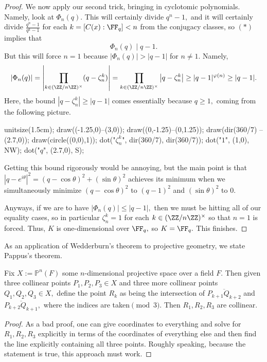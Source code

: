 \begin{proof}
	We now apply our second trick, bringing in cyclotomic polynomials. Namely, look at $\Phi_n(q).$ This will certainly divide $q^n-1,$ and it will certainly divide $\frac{q^n-1}{q^k-1}$ for each $k=[C(x):\FF_q]<n$ from the conjugacy classes, so $(*)$ implies that
	\[\Phi_n(q)\mid q-1.\]
	But this will force $n=1$ because $|\Phi_n(q)|>|q-1|$ for $n\ne1.$ Namely,
	\[\left|\Phi_n(q)\right|=\left|\prod_{k\in(\ZZ/n\ZZ)^\times}(q-\zeta_n^k)\right|=\prod_{k\in(\ZZ/n\ZZ)^\times}\left|q-\zeta_n^k\right|\ge|q-1|^{\varphi(n)}\ge|q-1|.\]
	Here, the bound $\left|q-\zeta_n^k\right|\ge|q-1|$ comes essentially because $q\ge1,$ coming from the following picture.
	\begin{center}
		\begin{asy}
			unitsize(1.5cm);
			draw((-1.25,0)--(3,0));
			draw((0,-1.25)--(0,1.25));
			draw(dir(360/7) -- (2.7,0));
			draw(circle((0,0),1));
			dot("$\zeta_n^k$", dir(360/7), dir(360/7));
			dot("$1$", (1,0), NW);
			dot("$q$", (2.7,0), S);
		\end{asy}
	\end{center}
	Getting this bound rigorously would be annoying, but the main point is that $\left|q-e^{i\theta}\right|^2=(q-\cos\theta)^2+(\sin\theta)^2$ achieves its minimum when we simultaneously minimize $(q-\cos\theta)^2$ to $(q-1)^2$ and $(\sin\theta)^2$ to $0.$

	Anyways, if we are to have $|\Phi_n(q)|\le|q-1|,$ then we must be hitting all of our equality cases, so in particular $\zeta_n^k=1$ for each $k\in(\ZZ/n\ZZ)^\times$ so that $n=1$ is forced. Thus, $K$ is one-dimensional over $\FF_q,$ so $K=\FF_q.$ This finishes.
\end{proof}
As an application of {Wedderburn}'s theorem to projective geometry, we state Pappus's theorem.
\begin{theorem}[Pappus]
	Fix $X:=\mathbb P^n(F)$ some $n$-dimensional projective space over a field $F.$ Then given three collinear points $P_1,P_2,P_3\in X$ and three more collinear points $Q_1,Q_2,Q_3\in X,$ define the point $R_k$ as being the intersection of $\overline{P_{k+1}Q_{k+2}}$ and $\overline{P_{k+2}Q_{k+1}},$ where the indices are taken$\pmod3.$ Then $R_1,R_2,R_3$ are collinear.
\end{theorem}
\begin{proof}
	As a bad proof, one can give coordinates to everything and solve for $R_1,R_2,R_3$ explicitly in terms of the coordinates of everything else and then find the line explicitly containing all three points. Roughly speaking, because the statement is true, this approach must work.
\end{proof}
